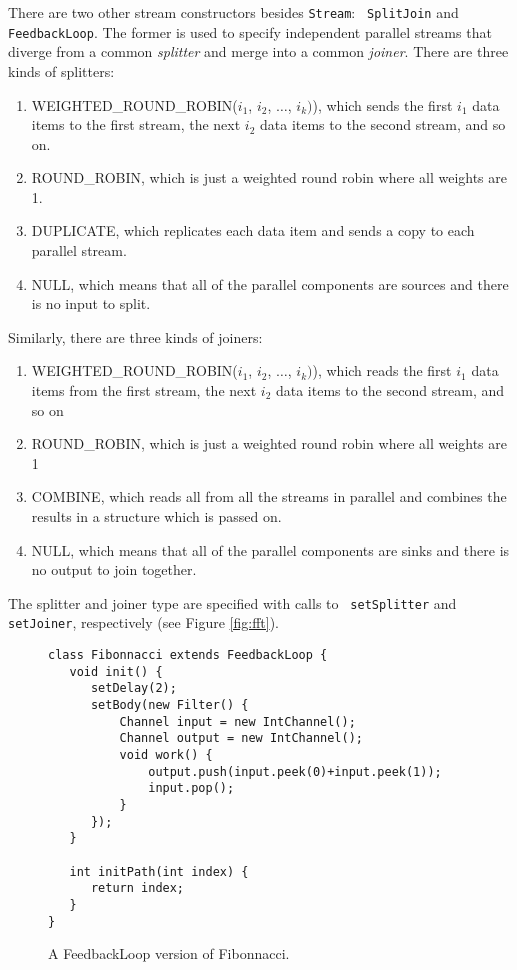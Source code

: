 There are two other stream constructors besides {\tt Stream}: {\tt
SplitJoin} and {\tt FeedbackLoop}.  The former is used to specify
independent parallel streams that diverge from a common {\it splitter}
and merge into a common {\it joiner}.  There are three kinds of
splitters:
\begin{enumerate}
\item WEIGHTED\_ROUND\_ROBIN($i_1$, $i_2$, $\dots$, $i_k)$),
which sends the first $i_1$ data items to the first stream, the next
$i_2$ data items to the second stream, and so on.
\item ROUND\_ROBIN, which is just a weighted round robin where all
weights are 1.
\item DUPLICATE, which replicates each data item and sends a copy to each
parallel stream.
\item NULL, which means that all of the parallel components are
sources and there is no input to split.
\end{enumerate}
Similarly, there are three kinds of joiners: 
\begin{enumerate}
\item WEIGHTED\_ROUND\_ROBIN($i_1$, $i_2$, $\dots$, $i_k)$), which reads the
first $i_1$ data items from the first stream, the next $i_2$ data
items to the second stream, and so on
\item ROUND\_ROBIN, which is just a weighted round robin where all
weights are 1
\item COMBINE, which reads all from all the streams in parallel and
combines the results in a structure which is passed on.
\item NULL, which means that all of the parallel components are sinks
and there is no output to join together.
\end{enumerate}
The splitter and joiner type are specified with calls to {\tt
setSplitter} and {\tt setJoiner}, respectively (see Figure \ref{fig:fft}).

\begin{figure}
\scriptsize
\begin{verbatim}
class Fibonnacci extends FeedbackLoop {
   void init() {
      setDelay(2);
      setBody(new Filter() {
          Channel input = new IntChannel();
          Channel output = new IntChannel();
          void work() {
              output.push(input.peek(0)+input.peek(1));
              input.pop();
          }
      });
   }

   int initPath(int index) {
      return index;
   }
}
\end{verbatim}
\vspace{-12pt}
\caption{\protect\small A FeedbackLoop version of Fibonnacci.
\protect\label{fig:feed}}
\vspace{-12pt}
\end{figure}

